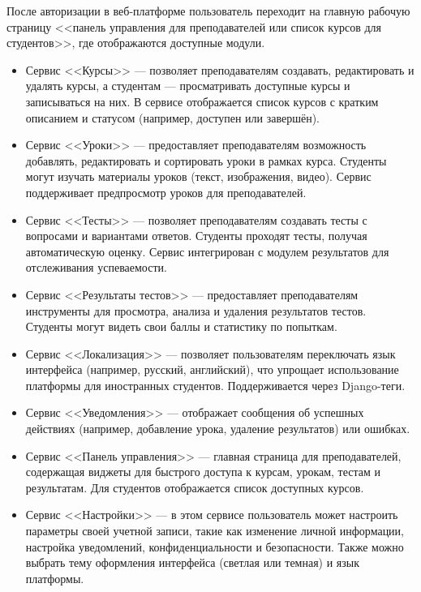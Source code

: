 После авторизации в веб-платформе пользователь переходит на главную рабочую страницу <<панель управления для преподавателей или список курсов для студентов>>,  где отображаются доступные модули.

\begin{itemize}
    \item Сервис <<Курсы>> — позволяет преподавателям создавать, редактировать и удалять курсы, а студентам --- просматривать доступные курсы и записываться на них. В сервисе отображается список курсов с кратким описанием и статусом (например, доступен или завершён).
    
    \item Сервис <<Уроки>> — предоставляет преподавателям возможность добавлять, редактировать и сортировать уроки в рамках курса. Студенты могут изучать материалы уроков (текст, изображения, видео). Сервис поддерживает предпросмотр уроков для преподавателей.

    \item Сервис <<Тесты>> — позволяет преподавателям создавать тесты с вопросами и вариантами ответов. Студенты проходят тесты, получая автоматическую оценку. Сервис интегрирован с модулем результатов для отслеживания успеваемости.

    \item Сервис <<Результаты тестов>> — предоставляет преподавателям инструменты для просмотра, анализа и удаления результатов тестов. Студенты могут видеть свои баллы и статистику по попыткам.

    \item Сервис <<Локализация>> — позволяет пользователям переключать язык интерфейса (например, русский, английский), что упрощает использование платформы для иностранных студентов. Поддерживается через Django-теги.

    \item Сервис <<Уведомления>> — отображает сообщения об успешных действиях (например, добавление урока, удаление результатов) или ошибках.

    \item Сервис <<Панель управления>> — главная страница для преподавателей, содержащая виджеты для быстрого доступа к курсам, урокам, тестам и результатам. Для студентов отображается список доступных курсов.

    \item Сервис <<Настройки>> — в этом сервисе пользователь может настроить параметры своей учетной записи, такие как изменение личной информации, настройка уведомлений, конфиденциальности и безопасности. Также можно выбрать тему оформления интерфейса (светлая или темная) и язык платформы.
\end{itemize}

